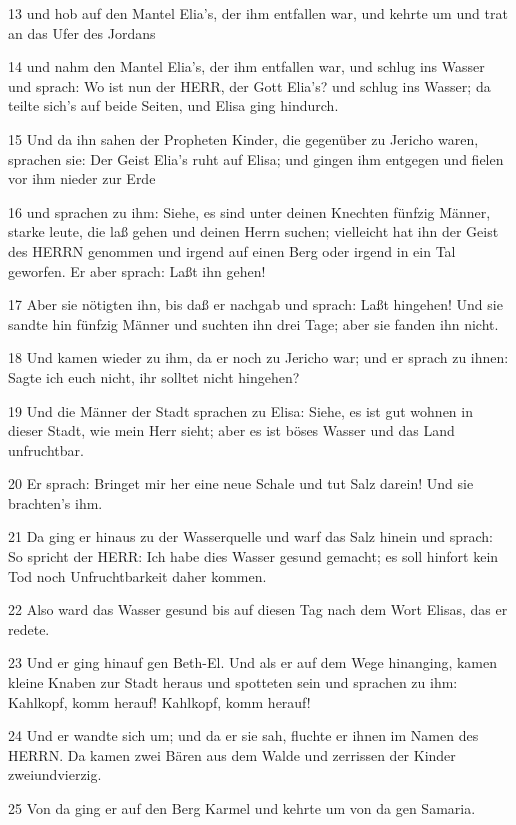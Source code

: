 \par 13 und hob auf den Mantel Elia's, der ihm entfallen war, und kehrte um und trat an das Ufer des Jordans
\par 14 und nahm den Mantel Elia's, der ihm entfallen war, und schlug ins Wasser und sprach: Wo ist nun der HERR, der Gott Elia's? und schlug ins Wasser; da teilte sich's auf beide Seiten, und Elisa ging hindurch.
\par 15 Und da ihn sahen der Propheten Kinder, die gegenüber zu Jericho waren, sprachen sie: Der Geist Elia's ruht auf Elisa; und gingen ihm entgegen und fielen vor ihm nieder zur Erde
\par 16 und sprachen zu ihm: Siehe, es sind unter deinen Knechten fünfzig Männer, starke leute, die laß gehen und deinen Herrn suchen; vielleicht hat ihn der Geist des HERRN genommen und irgend auf einen Berg oder irgend in ein Tal geworfen. Er aber sprach: Laßt ihn gehen!
\par 17 Aber sie nötigten ihn, bis daß er nachgab und sprach: Laßt hingehen! Und sie sandte hin fünfzig Männer und suchten ihn drei Tage; aber sie fanden ihn nicht.
\par 18 Und kamen wieder zu ihm, da er noch zu Jericho war; und er sprach zu ihnen: Sagte ich euch nicht, ihr solltet nicht hingehen?
\par 19 Und die Männer der Stadt sprachen zu Elisa: Siehe, es ist gut wohnen in dieser Stadt, wie mein Herr sieht; aber es ist böses Wasser und das Land unfruchtbar.
\par 20 Er sprach: Bringet mir her eine neue Schale und tut Salz darein! Und sie brachten's ihm.
\par 21 Da ging er hinaus zu der Wasserquelle und warf das Salz hinein und sprach: So spricht der HERR: Ich habe dies Wasser gesund gemacht; es soll hinfort kein Tod noch Unfruchtbarkeit daher kommen.
\par 22 Also ward das Wasser gesund bis auf diesen Tag nach dem Wort Elisas, das er redete.
\par 23 Und er ging hinauf gen Beth-El. Und als er auf dem Wege hinanging, kamen kleine Knaben zur Stadt heraus und spotteten sein und sprachen zu ihm: Kahlkopf, komm herauf! Kahlkopf, komm herauf!
\par 24 Und er wandte sich um; und da er sie sah, fluchte er ihnen im Namen des HERRN. Da kamen zwei Bären aus dem Walde und zerrissen der Kinder zweiundvierzig.
\par 25 Von da ging er auf den Berg Karmel und kehrte um von da gen Samaria.

